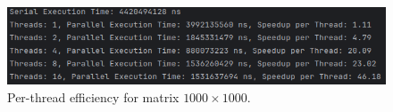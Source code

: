 \documentclass[a4paper,12pt]{article}
\begin{document}
\begin{figure}[H]
    \centering
    \includegraphics[width=\textwidth]{ThreadSpeedUpTest1000.png}
    \caption{Per-thread efficiency for matrix $1000 \times 1000$.}
    \label{fig:speedup_1000}
\end{figure}
\end{document}
